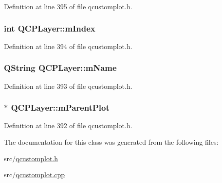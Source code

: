 Definition at line 395 of file qcustomplot.\-h.

\hypertarget{class_q_c_p_layer_a122088bcab6cec76a52b75ce8606605b}{
\subsubsection[{m\-Index}]{\setlength{\rightskip}{0pt plus 5cm}int Q\-C\-P\-Layer\-::m\-Index\hspace{0.3cm}{\ttfamily [protected]}}}\label{class_q_c_p_layer_a122088bcab6cec76a52b75ce8606605b}


Definition at line 394 of file qcustomplot.\-h.

\hypertarget{class_q_c_p_layer_a91e6298183cb4b9dfd4efdfaf1ecc220}{
\subsubsection[{m\-Name}]{\setlength{\rightskip}{0pt plus 5cm}Q\-String Q\-C\-P\-Layer\-::m\-Name\hspace{0.3cm}{\ttfamily [protected]}}}\label{class_q_c_p_layer_a91e6298183cb4b9dfd4efdfaf1ecc220}


Definition at line 393 of file qcustomplot.\-h.

\hypertarget{class_q_c_p_layer_a2f3374a7884bf403720cd1cf6f7ad1bb}{
\subsubsection[{m\-Parent\-Plot}]{$\ast$ Q\-C\-P\-Layer\-::m\-Parent\-Plot\hspace{0.3cm}{\ttfamily [protected]}}}\label{class_q_c_p_layer_a2f3374a7884bf403720cd1cf6f7ad1bb}


Definition at line 392 of file qcustomplot.\-h.



The documentation for this class was generated from the following files\-:\begin{DoxyCompactItemize}
\item 
src/\hyperlink{qcustomplot_8h}{qcustomplot.\-h}\item 
src/\hyperlink{qcustomplot_8cpp}{qcustomplot.\-cpp}\end{DoxyCompactItemize}
